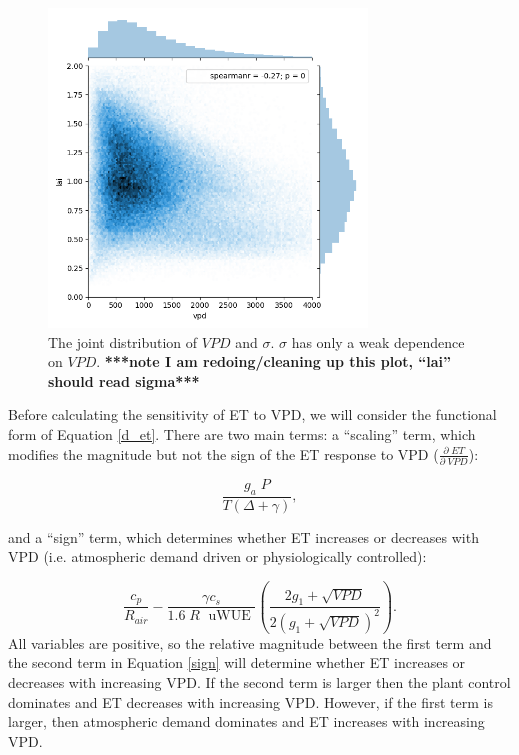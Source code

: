 \documentclass[draft,linenumbers]{agujournal}
\begin{document}
\begin{figure}[h]
\centering
\includegraphics[width=20pc]{./fig03.png}
\caption{The joint distribution of $VPD$ and $\sigma$. $\sigma$ has only a weak dependence on $VPD$. \textbf{***note I am redoing/cleaning up this plot, ``lai'' should read sigma***}}
\label{lai_vpd_fig}
\end{figure}

Before calculating the sensitivity of ET to VPD, we will consider the functional form of Equation \ref{d_et}. There are two main terms: a ``scaling'' term, which modifies the magnitude but not the sign of the ET response to VPD  ($\frac{\partial \; ET}{\partial \; VPD}$):

\begin{equation}
  \frac{g_a \; P}{T(\Delta + \gamma)},
\end{equation}

and a ``sign'' term, which determines whether ET increases or decreases with VPD (i.e. atmospheric demand driven or physiologically controlled):

\begin{equation}
  \label{sign}
  \frac{c_p}{R_{air}} - \frac{\gamma c_s }{1.6 \; R\; \text{ uWUE }} \left( \frac{2 g_1 + \sqrt{VPD}}{2 (g_1 + \sqrt{VPD})^2}\right).
\end{equation}
All variables are positive, so the relative magnitude between the first term and the second term in Equation \ref{sign} will determine whether ET increases or decreases with increasing VPD. If the second term is larger then the plant control dominates and ET decreases with increasing VPD. However, if the first term is larger, then atmospheric demand dominates and ET increases with increasing VPD. 
\end{document}
